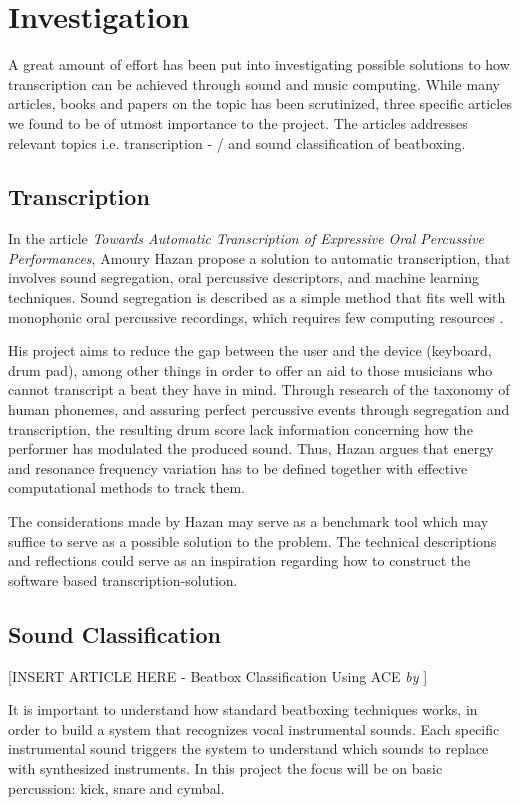 \section{Investigation}
A great amount of effort has been put into investigating possible solutions to how transcription can be achieved through sound and music computing. While many articles, books and papers on the topic has been scrutinized, three specific articles we found to be of utmost importance to the project. The articles addresses relevant topics i.e. transcription - / and sound classification of beatboxing.

\subsection{Transcription}
In the article \textit{Towards Automatic Transcription of Expressive Oral Percussive Performances}, Amoury Hazan propose a solution to automatic transcription, that involves sound segregation, oral percussive descriptors, and machine learning techniques. Sound segregation is described as a simple method that fits well with monophonic oral percussive recordings, which requires few computing resources \citep{Hazan2005a}.	

His project aims to reduce the gap between the user and the device (keyboard, drum pad), among other things in order to offer an aid to those musicians who cannot transcript a beat they have in mind.
Through research of the taxonomy of human phonemes, and assuring perfect percussive events through segregation and transcription, the resulting drum score lack information concerning how the performer has modulated the produced sound. Thus, Hazan argues that energy and resonance frequency variation has to be defined together with effective computational methods to track them.
	
The considerations made by Hazan may serve as a benchmark tool which may suffice to serve as a possible solution to the problem. The technical descriptions and reflections could serve as an inspiration regarding how to construct the software based transcription-solution.

\subsection{Sound Classification}

[INSERT ARTICLE HERE - Beatbox Classification Using ACE \textit{by} \citep{Sinyor05} ]

It is important to understand how standard beatboxing techniques works, in order to build a system that recognizes vocal instrumental sounds. Each specific instrumental sound triggers the system to understand which sounds to replace with synthesized instruments. In this project the focus will be on basic percussion: kick, snare and cymbal.

